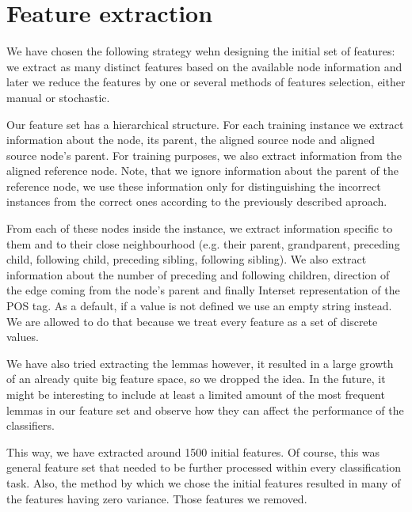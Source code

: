 \section{Feature extraction}
\label{sec:feat_extract}


We have chosen the following strategy wehn designing the initial set of features:
we extract as many distinct features based on the available node information
and later we reduce the features by one or several methods
of features selection, either manual or stochastic.

Our feature set has a hierarchical structure. For each training instance we extract
information about the node, its parent, the aligned source node and aligned source node's
parent. For training purposes, we also extract information from the aligned reference
node. Note, that we ignore information about the parent of the reference node, we
use these information only for distinguishing the incorrect instances from the correct ones
according to the previously described aproach.

From each of these  nodes inside the instance, we extract information
specific to them and to their close neighbourhood (e.g. their parent, grandparent,
preceding child, following child, preceding sibling, following sibling). We
also extract information about the number of preceding and following children,
direction of the edge coming from the node's parent and finally Interset representation
of the POS tag. As a default, if a value is not defined we use an empty string instead.
We are allowed to do that because we treat every feature as a set of discrete values.

We have also tried extracting the lemmas however, it resulted in a
large growth of an already quite big feature space, so we dropped the idea.
In the future, it might be interesting to include at least a limited amount of the most frequent lemmas in our
feature set and observe how they can affect the performance of the classifiers.

This way, we have extracted around 1500 initial features. Of course, this was general feature
set that needed to be further processed within every classification task. Also, the method
by which we chose the initial features resulted in many of the features having zero
variance. Those features we removed.


